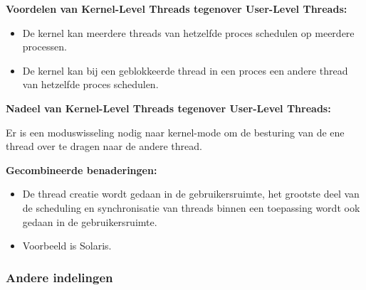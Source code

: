 \textbf{Voordelen van Kernel-Level Threads tegenover User-Level Threads:}

\begin{itemize}
    \item De kernel kan meerdere threads van hetzelfde proces schedulen op meerdere processen.
    \item De kernel kan bij een geblokkeerde thread in een proces een andere thread van hetzelfde proces schedulen.
\end{itemize}

\textbf{Nadeel van Kernel-Level Threads tegenover User-Level Threads:}

Er is een moduswisseling nodig naar kernel-mode om de besturing van de ene thread over te dragen naar de andere thread.

\textbf{Gecombineerde benaderingen:}

\begin{itemize}
\item De thread creatie wordt gedaan in de gebruikersruimte, het grootste deel van de scheduling en synchronisatie van threads binnen een toepassing wordt ook gedaan in de gebruikersruimte.
\item Voorbeeld is Solaris.
\end{itemize}

\subsubsection{Andere indelingen}

